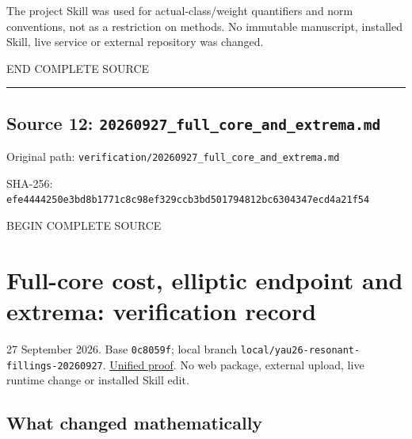\documentclass[
  10pt,
]{article}
\begin{document}
The project Skill was used for actual-class/weight quantifiers and norm
conventions, not as a restriction on methods. No immutable manuscript,
installed Skill, live service or external repository was changed.

END COMPLETE SOURCE

\begin{center}\rule{0.5\linewidth}{0.5pt}\end{center}

\hypertarget{source-12-20260927_full_core_and_extrema.md}{%
\subsection{Source 12:
\nolinkurl{20260927_full_core_and_extrema.md}}\label{source-12-20260927_full_core_and_extrema.md}}

Original path:
\nolinkurl{verification/20260927_full_core_and_extrema.md}

SHA-256:
\nolinkurl{efe4444250e3bd8b1771c8c98ef329ccb3bd501794812bc6304347ecd4a21f54}

BEGIN COMPLETE SOURCE

\hypertarget{full-core-cost-elliptic-endpoint-and-extrema-verification-record}{%
\section{Full-core cost, elliptic endpoint and extrema: verification
record}\label{full-core-cost-elliptic-endpoint-and-extrema-verification-record}}

27 September 2026. Base \texttt{0c8059f}; local branch
\nolinkurl{local/yau26-resonant-fillings-20260927}.
\href{../continuation/20260927_full_core_cost_and_extremal_metrics.md}{Unified
proof}. No web package, external upload, live runtime change or
installed Skill edit.

\hypertarget{what-changed-mathematically-3}{%
\subsection{What changed
mathematically}\label{what-changed-mathematically-3}}
\end{document}
